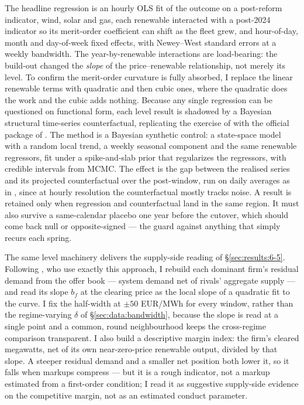 \documentclass[11pt,a4paper]{article}
\theoremstyle{definition}
\theoremstyle{remark}
\theoremstyle{plain}
\begin{document}
The headline regression is an hourly OLS fit of the outcome on a post-reform indicator, wind, solar and gas, each renewable interacted with a post-2024 indicator so its merit-order coefficient can shift as the fleet grew, and hour-of-day, month and day-of-week fixed effects, with Newey--West standard errors at a weekly bandwidth. The year-by-renewable interactions are load-bearing: the build-out changed the \emph{slope} of the price--renewable relationship, not merely its level. To confirm the merit-order curvature is fully absorbed, I replace the linear renewable terms with quadratic and then cubic ones, where the quadratic does the work and the cubic adds nothing. Because any single regression can be questioned on functional form, each level result is shadowed by a Bayesian structural time-series counterfactual, replicating the exercise of \citet{markle_huss_2017} with the official package of \citet{brodersen_2015}. The method is a Bayesian synthetic control: a state-space model with a random local trend, a weekly seasonal component and the same renewable regressors, fit under a spike-and-slab prior that regularizes the regressors, with credible intervals from MCMC. The effect is the gap between the realised series and its projected counterfactual over the post-window, run on daily averages as in \citet{markle_huss_2017}, since at hourly resolution the counterfactual mostly tracks noise. A result is retained only when regression and counterfactual land in the same region. It must also survive a same-calendar placebo one year before the cutover, which should come back null or opposite-signed --- the guard against anything that simply recurs each spring.

The same level machinery delivers the supply-side reading of \S\ref{sec:results:6-5}. Following \citet[\S III.A]{ito_reguant_2016}, who use exactly this approach, I rebuild each dominant firm's residual demand from the offer book --- system demand net of rivals' aggregate supply --- and read its slope $b_{f}$ at the clearing price as the local slope of a quadratic fit to the curve. I fix the half-width at $\pm 50$ EUR/MWh for every window, rather than the regime-varying $\delta$ of \S\ref{sec:data:bandwidth}, because the slope is read at a single point and a common, round neighbourhood keeps the cross-regime comparison transparent.
 I also build a descriptive margin index: the firm's cleared megawatts, net of its own near-zero-price renewable output, divided by that slope. A steeper residual demand and a smaller net position both lower it, so it falls when markups compress --- but it is a rough indicator, not a markup estimated from a first-order condition;
  I read it as suggestive supply-side evidence on the competitive margin, not as an estimated conduct parameter.
\end{document}
